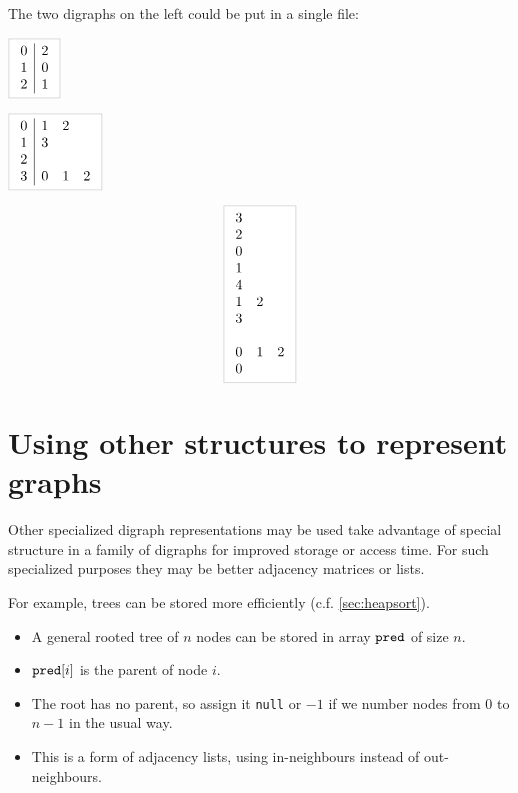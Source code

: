 \begin{Boxample} 
The two digraphs on the left could be put in a single file:\\

\begin{minipage}[c]{0.5\textwidth}
\centering
	$\lightgraybox{\begin{array}{c|c}
	0 & 2  \\
	1 & 0  \\
	2 & 1 \\
	\end{array}}$
	
	\vspace{1cm}
	$\lightgraybox{\begin{array}{c|ccc}
	0 & 1 & 2  \\
	1 & 3  \\
	2  \\
	3 & 0 & 1 & 2 \\
	\end{array}}$
\end{minipage}
\begin{minipage}[c]{0.5\textwidth}
$$
\lightgraybox{
	\begin{array}{ccc}
	3 &   &   \\
	2 &   &   \\
	0 &   &   \\
	1 &   &   \\
	4 &   &   \\
	1 & 2 &   \\
	3 &   &   \\
	  &   &   \\
	0 & 1 &  2 \\
	0 &   &   \\
	\end{array}
}
$$
\end{minipage}
\end{Boxample}


\section{Using other structures to represent graphs}

Other specialized digraph representations may be used take advantage of
special structure in a family of digraphs for improved storage or access time. For such specialized
purposes they may be better adjacency matrices or lists.

For example, trees can be stored more efficiently (c.f. \cref{sec:heapsort}).  
\begin{itemize}
\item A general rooted tree of $n$ nodes can be stored in array $\operatorname{\text{\texttt{pred}}}$ of size $n$. 
\item $\operatorname{\text{\texttt{pred}}}[i]$ is the parent of node $i$. 
\item The root has no parent, so assign it \texttt{null} or $-1$ if we number nodes from $0$
to $n-1$ in the usual way. 
\item This is a form of adjacency lists, using in-neighbours instead of out-neighbours.
\end{itemize}

